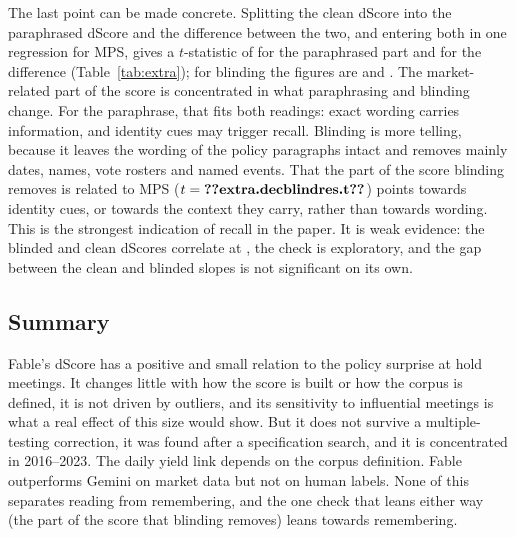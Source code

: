 The last point can be made concrete. Splitting the clean dScore into the paraphrased dScore and the
difference between the two, and entering both in one regression for MPS, gives a $t$-statistic of
 for the paraphrased part and  for the difference
(Table~\ref{tab:extra}); for blinding the figures are  and .
The market-related part of the score is concentrated in what paraphrasing and blinding change. For the
paraphrase, that fits both readings: exact wording carries information, and identity cues may trigger
recall. Blinding is more telling, because it leaves the wording of the policy paragraphs intact and
removes mainly dates, names, vote rosters and named events. That the part of the score blinding removes is
related to MPS ($t=\R{extra.decblindres.t}$) points towards identity cues, or towards the context they
carry, rather than towards wording. This is the strongest indication of recall in the paper. It is weak
evidence: the blinded and clean dScores correlate at , the check is
exploratory, and the gap between the clean and blinded slopes is not significant on its own.

\subsection{Summary}

Fable's dScore has a positive and small relation to the policy surprise at hold meetings. It changes
little with how the score is built or how the corpus is defined, it is not driven by outliers, and its
sensitivity to influential meetings is what a real effect of this size would show. But it does not survive
a multiple-testing correction, it was found after a specification search, and it is concentrated in
2016--2023. The daily yield link depends on the corpus definition. Fable outperforms Gemini on market
data but not on human labels. None of this separates reading from remembering, and the one check that
leans either way (the part of the score that blinding removes) leans towards remembering.
